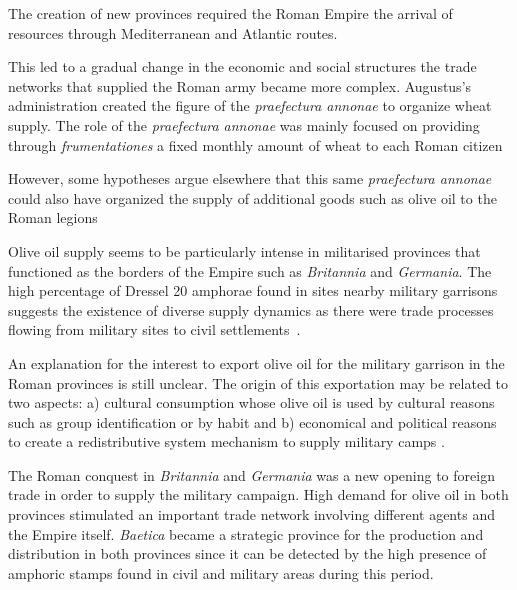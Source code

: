 \documentclass[review]{elsarticle}
\newcommand{\memo}[2]{\textcolor{#1}{#2}}
\newcommand{\xavi}[1]{\memo{magenta}{XRC: #1\\}}
\begin{document}
The creation of new provinces required the Roman Empire the arrival of resources through Mediterranean and Atlantic routes.

This led to a gradual change in the economic and social structures the trade networks that supplied the Roman army became more complex. Augustus's administration created the figure of the \textit{praefectura annonae} to organize wheat supply. The role of the \textit{praefectura annonae} was mainly focused on providing through \textit{frumentationes} a fixed monthly amount of wheat to each Roman citizen~\citep{remesal_annona_1986,remesal_concierto}

However, some hypotheses argue elsewhere that this same \textit{praefectura annonae} could also have organized the supply of additional goods such as olive oil to the Roman legions  \citep{remesal_annona_1986,
remesal_annona_1990}


 

Olive oil supply seems to be particularly intense in militarised provinces that functioned as the borders of the Empire such as \textit{Britannia} and \textit{Germania}. The high percentage of Dressel 20 amphorae found in sites nearby military garrisons suggests the existence of diverse supply dynamics as there were trade processes flowing from military sites to civil settlements~\citep{remesal_annona_1986, carreras_britannia_1998}.

An explanation for the interest to export olive oil for the military garrison in the Roman provinces is still unclear. The origin of this exportation may be related to two aspects: a) cultural consumption whose olive oil is used by cultural reasons such as group identification or by habit and b) economical and political reasons to create a redistributive system mechanism to supply military camps \citep[69-70]{carreras_britannia_1998}. 

The Roman conquest in \textit{Britannia} and \textit{Germania} was a new opening to foreign trade in order to supply the military campaign. High demand for olive oil in both provinces stimulated an important trade network involving different agents and the Empire itself. \textit{Baetica} became a strategic province for the production and distribution in both provinces since it can be detected by the high presence of amphoric stamps found in civil and military areas during this period. 
\end{document}
